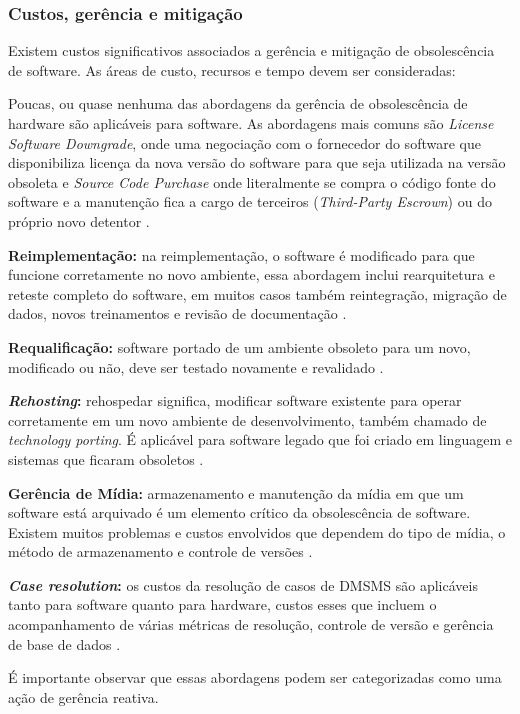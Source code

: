 \subsubsection{\esp Custos, gerência e mitigação}

Existem custos significativos associados a gerência e mitigação de obsolescência de software. As áreas de custo, recursos e tempo devem ser consideradas:

Poucas, ou quase nenhuma das abordagens da gerência de obsolescência de hardware são aplicáveis para software. As abordagens mais comuns são \textit{License Software Downgrade}, onde uma negociação com o fornecedor do software que disponibiliza licença da nova versão do software para que seja utilizada na versão obsoleta e \textit{Source Code Purchase} onde literalmente se compra o código fonte do software e a manutenção fica a cargo de terceiros (\textit{Third-Party Escrown}) ou do próprio novo detentor \cite{sandborn2007}. 

{\textbf{Reimplementação:}} na reimplementação, o software é modificado para que funcione corretamente no novo ambiente, essa abordagem inclui rearquitetura e reteste completo do software, em muitos casos também reintegração, migração de dados, novos treinamentos e revisão de documentação \cite{sandborn2007}.

{\textbf{Requalificação:}} software portado de um ambiente obsoleto para um novo, modificado ou não, deve ser testado novamente e revalidado \cite{sandborn2007}.

{\textbf{\textit{Rehosting}:}} rehospedar significa, modificar software existente para operar corretamente em um novo ambiente de desenvolvimento, também chamado de \textit{technology porting}. É aplicável para software legado que foi criado em linguagem e sistemas que ficaram obsoletos \cite{sandborn2007}.

{\textbf{Gerência de Mídia:} armazenamento e manutenção da mídia em que um software está arquivado é um elemento crítico da obsolescência de software. Existem muitos problemas e custos envolvidos que dependem do tipo de mídia, o método de armazenamento e controle de versões \cite{sandborn2007}. }

{\textbf{\textit{Case resolution}:} os custos da  resolução de casos de DMSMS são aplicáveis tanto para software quanto para hardware, custos esses que incluem o acompanhamento de várias métricas de resolução, controle de versão e gerência de base de dados \cite{sandborn2007}.

É importante observar que essas abordagens podem ser categorizadas como uma ação de gerência reativa.}

